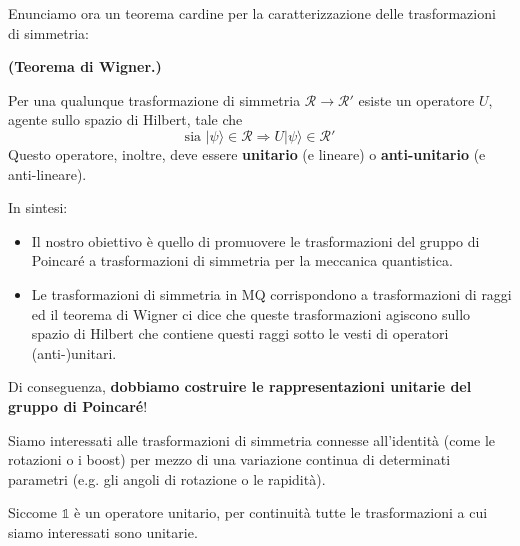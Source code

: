 \documentclass[../main.tex]{subfiles}
\begin{document}
Enunciamo ora un teorema cardine per la caratterizzazione delle trasformazioni di simmetria:

\begin{theorem}
    \textbf{(Teorema di Wigner.)}
    
    Per una qualunque trasformazione di simmetria \(\mathscr R \rightarrow \mathscr R'\) esiste un operatore \(U\), agente sullo spazio di Hilbert, tale che 
    \[
    \text{sia } |\psi\rangle \in \mathscr R \Rightarrow U|\psi\rangle \in \mathscr R' 
    \]
    Questo operatore, inoltre, deve essere \textbf{unitario} (e lineare) o \textbf{anti-unitario} (e anti-lineare).
    \label{th:Wigner}
\end{theorem}

In sintesi:
\begin{itemize}
    \item Il nostro obiettivo è quello di promuovere le trasformazioni del gruppo di Poincaré a trasformazioni di simmetria per la meccanica quantistica.

    \item Le trasformazioni di simmetria in MQ corrispondono a trasformazioni di raggi ed il teorema di Wigner ci dice che queste trasformazioni agiscono sullo spazio di Hilbert che contiene questi raggi sotto le vesti di operatori (anti-)unitari.
\end{itemize}
Di conseguenza, \textbf{dobbiamo costruire le rappresentazioni unitarie del gruppo di Poincaré}!

\begin{nota}
    Siamo interessati alle trasformazioni di simmetria connesse all'identità (come le rotazioni o i boost) per mezzo di una variazione continua di determinati parametri (e.g. gli angoli di rotazione o le rapidità). 

    Siccome \(\mathbb 1\) è un operatore unitario, per continuità tutte le trasformazioni a cui siamo interessati sono unitarie. 
\end{nota}
\end{document}
